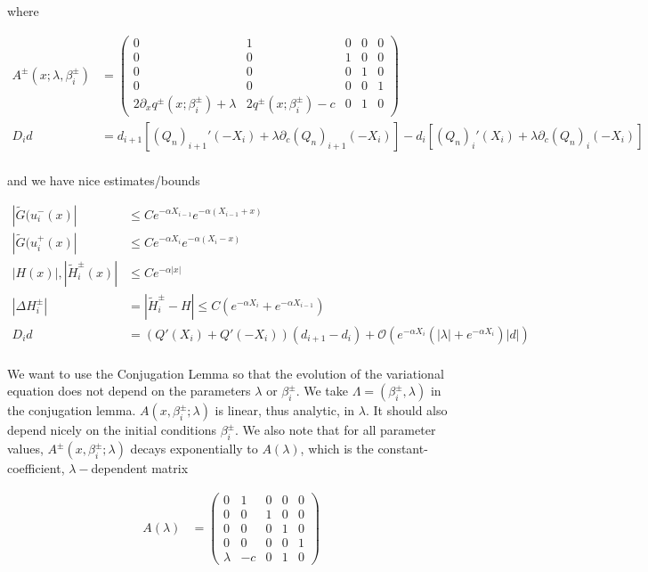\documentclass[12pt]{article}
\begin{document}
where

\begin{align*}
A^\pm(x; \lambda, \beta_i^\pm) &= \begin{pmatrix}0 & 1 & 0 & 0 & 0 \\0 & 0 & 1 & 0 & 0 \\0 & 0 & 0 & 1 & 0 \\0 & 0 & 0 & 0 & 1 \\
2 \partial_x q^\pm(x; \beta_i^\pm) + \lambda & 2 q^\pm(x; \beta_i^\pm) - c & 0 & 1 & 0 \end{pmatrix} \\
D_i d &= d_{i+1}[(Q_n)_{i+1}'(-X_i) + \lambda \partial_c (Q_n)_{i+1}(-X_i)]
- d_i [ (Q_n)_i'(X_i) + \lambda \partial_c (Q_n)_i(-X_i) ] \\
\end{align*}

and we have nice estimates/bounds

\begin{align*}
|\tilde{G}(u_i^-(x)| &\leq C e^{-\alpha X_{i-1}} e^{-\alpha(X_{i-1} + x) } \\
|\tilde{G}(u_i^+(x)| &\leq C e^{-\alpha X_i} e^{-\alpha(X_i - x) } \\
|H(x)|, |\tilde{H}_i^\pm(x)| &\leq C e^{-\alpha |x|} \\
|\Delta H_i^\pm| &= |\tilde{H}_i^\pm - H| \leq C(e^{-\alpha X_i} + e^{-\alpha X_{i-1}} ) \\
D_i d &= ( Q'(X_i) + Q'(-X_i))(d_{i+1} - d_i ) + \mathcal{O} \left( e^{-\alpha X_i} \left( |\lambda| +  e^{-\alpha X_i}  \right) |d| \right) \\
\end{align*}

We want to use the Conjugation Lemma so that the evolution of the variational equation does not depend on the parameters $\lambda$ or $\beta_i^\pm$. We take $\Lambda = (\beta_i^\pm, \lambda)$ in the conjugation lemma. $A(x, \beta_i^\pm; \lambda)$ is linear, thus analytic, in $\lambda$. It should also depend nicely on the initial conditions $\beta_i^\pm$. We also note that for all parameter values, $A^\pm(x, \beta_i^\pm; \lambda)$ decays exponentially to $A(\lambda)$, which is the constant-coefficient, $\lambda-$dependent matrix 

\begin{align*}
A(\lambda) &=  \begin{pmatrix}0 & 1 & 0 & 0 & 0 \\0 & 0 & 1 & 0 & 0 \\0 & 0 & 0 & 1 & 0 \\0 & 0 & 0 & 0 & 1 \\
\lambda & -c & 0 & 1 & 0 \end{pmatrix}
\end{align*}
\end{document}
